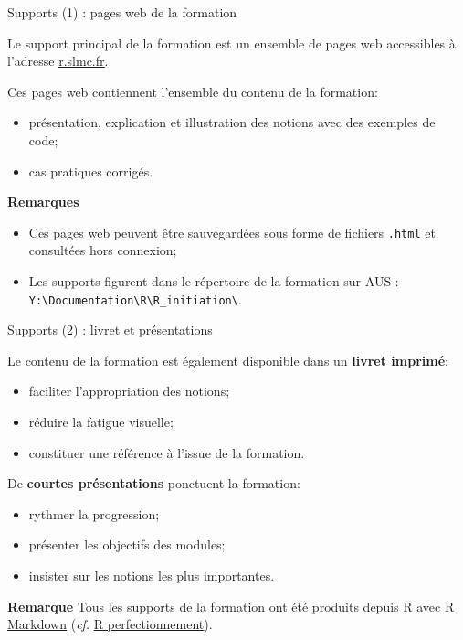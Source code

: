 \documentclass[12pt,ignorenonframetext,]{beamer}
\providecommand{\tightlist}{%
  \setlength{\itemsep}{0pt}\setlength{\parskip}{0pt}}
\newcommand{\strong}[1]{\textbf{\textcolor{redInsee}{#1}}}
\newcommand{\link}[1]{\textcolor{redInsee}{\underline{#1}}}
\begin{document}
\begin{frame}[fragile]{Supports (1) : pages web de la formation}

Le support principal de la formation est un ensemble de pages web
accessibles à l'adresse \href{http://r.slmc.fr}{\link{r.slmc.fr}}.

\bigskip \pause Ces pages web contiennent l'ensemble du contenu de la
formation:

\begin{itemize}
\tightlist
\item
  présentation, explication et illustration des notions avec des
  exemples de code;
\item
  cas pratiques corrigés.
\end{itemize}

\bigskip \pause \strong{Remarques}

\begin{itemize}
\tightlist
\item
  Ces pages web peuvent être sauvegardées sous forme de fichiers
  \texttt{.html} et consultées hors connexion;
\item
  Les supports figurent dans le répertoire de la formation sur AUS :
  \texttt{Y:\textbackslash{}Documentation\textbackslash{}R\textbackslash{}R\_initiation\textbackslash{}}.
\end{itemize}

\end{frame}

\begin{frame}{Supports (2) : livret et présentations}

Le contenu de la formation est également disponible dans un
\strong{livret imprimé}:

\begin{itemize}
\tightlist
\item
  faciliter l'appropriation des notions;
\item
  réduire la fatigue visuelle;
\item
  constituer une référence à l'issue de la formation.
\end{itemize}

\bigskip \pause De \strong{courtes présentations} ponctuent la
formation:

\begin{itemize}
\tightlist
\item
  rythmer la progression;
\item
  présenter les objectifs des modules;
\item
  insister sur les notions les plus importantes.
\end{itemize}

\bigskip \pause \strong{Remarque} Tous les supports de la formation ont
été produits depuis R avec
\href{http://rmarkdown.rstudio.com/}{\link{R Markdown}} (\emph{cf.}
\href{http://t.slmc.fr/perf}{\link{R perfectionnement}}).

\end{frame}
\end{document}
